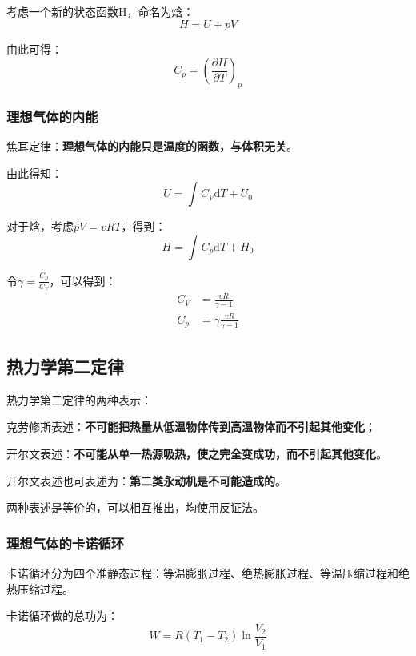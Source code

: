 \documentclass[UTF8]{ctexart}
\newcommand{\dif}{\mathrm{d}}
\begin{document}
	考虑一个新的状态函数H，命名为焓：
	\begin{equation}
		H=U+pV
	\end{equation}

\noindent 由此可得：
\begin{equation}
	C_{p}=\left(\frac{\partial H}{\partial T}\right)_{p}
\end{equation}

	\subsubsection{理想气体的内能}
	焦耳定律：\textbf{理想气体的内能只是温度的函数，与体积无关}。
	
	由此得知：
	\begin{equation}
		U = \int C_{V} \dif T+U_{0}
	\end{equation}
	
	对于焓，考虑$ pV=vRT $，得到：
	\begin{equation}
		H=\int C_{p} \dif T + H_{0}
	\end{equation}
	
	令$ \gamma=\frac{C_{p}}{C_{V}} $，可以得到：
	\begin{equation}
	\begin{aligned}
	C_{V}&=\frac{v R}{\gamma-1}\\
	C_{p}&=\gamma \frac{v R}{\gamma-1}
	\end{aligned}
	\end{equation}
	
	\subsection{热力学第二定律}
	热力学第二定律的两种表示：
	
	克劳修斯表述：\textbf{不可能把热量从低温物体传到高温物体而不引起其他变化}；
	
	开尔文表述：\textbf{不可能从单一热源吸热，使之完全变成功，而不引起其他变化}。
	
	开尔文表述也可表述为：\textbf{第二类永动机是不可能造成的}。
	
	两种表述是等价的，可以相互推出，均使用反证法。
	
	\subsubsection{理想气体的卡诺循环}
	卡诺循环分为四个准静态过程：等温膨胀过程、绝热膨胀过程、等温压缩过程和绝热压缩过程。
	
	卡诺循环做的总功为：
	\begin{equation}
		W = R(T_{1}-T_{2}) \ln \frac{V_{2}}{V_{1}}
	\end{equation}
\end{document}
